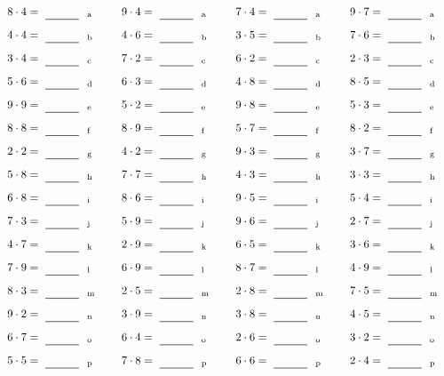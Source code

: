 \documentclass
[
  draft    = true,
  fontsize = 11pt,
  parskip  = half-
]
{scrartcl}
\begin{document}
\par\vfill\par
\begin{align*}
    \pline{8\cdot4}&=\rline{a}
  & \pline{9\cdot4}&=\rline{a}
  & \pline{7\cdot4}&=\rline{a}
  & \pline{9\cdot7}&=\rline{a} \\[1ex]
    \pline{4\cdot4}&=\rline{b}
  & \pline{4\cdot6}&=\rline{b}
  & \pline{3\cdot5}&=\rline{b}
  & \pline{7\cdot6}&=\rline{b} \\[1ex]
    \pline{3\cdot4}&=\rline{c}
  & \pline{7\cdot2}&=\rline{c}
  & \pline{6\cdot2}&=\rline{c}
  & \pline{2\cdot3}&=\rline{c} \\[1ex]
    \pline{5\cdot6}&=\rline{d}
  & \pline{6\cdot3}&=\rline{d}
  & \pline{4\cdot8}&=\rline{d}
  & \pline{8\cdot5}&=\rline{d} \\[1ex]
    \pline{9\cdot9}&=\rline{e}
  & \pline{5\cdot2}&=\rline{e}
  & \pline{9\cdot8}&=\rline{e}
  & \pline{5\cdot3}&=\rline{e} \\[1ex]
    \pline{8\cdot8}&=\rline{f}
  & \pline{8\cdot9}&=\rline{f}
  & \pline{5\cdot7}&=\rline{f}
  & \pline{8\cdot2}&=\rline{f} \\[1ex]
    \pline{2\cdot2}&=\rline{g}
  & \pline{4\cdot2}&=\rline{g}
  & \pline{9\cdot3}&=\rline{g}
  & \pline{3\cdot7}&=\rline{g} \\[1ex]
    \pline{5\cdot8}&=\rline{h}
  & \pline{7\cdot7}&=\rline{h}
  & \pline{4\cdot3}&=\rline{h}
  & \pline{3\cdot3}&=\rline{h} \\[1ex]
    \pline{6\cdot8}&=\rline{i}
  & \pline{8\cdot6}&=\rline{i}
  & \pline{9\cdot5}&=\rline{i}
  & \pline{5\cdot4}&=\rline{i} \\[1ex]
    \pline{7\cdot3}&=\rline{j}
  & \pline{5\cdot9}&=\rline{j}
  & \pline{9\cdot6}&=\rline{j}
  & \pline{2\cdot7}&=\rline{j} \\[1ex]
    \pline{4\cdot7}&=\rline{k}
  & \pline{2\cdot9}&=\rline{k}
  & \pline{6\cdot5}&=\rline{k}
  & \pline{3\cdot6}&=\rline{k} \\[1ex]
    \pline{7\cdot9}&=\rline{l}
  & \pline{6\cdot9}&=\rline{l}
  & \pline{8\cdot7}&=\rline{l}
  & \pline{4\cdot9}&=\rline{l} \\[1ex]
    \pline{8\cdot3}&=\rline{m}
  & \pline{2\cdot5}&=\rline{m}
  & \pline{2\cdot8}&=\rline{m}
  & \pline{7\cdot5}&=\rline{m} \\[1ex]
    \pline{9\cdot2}&=\rline{n}
  & \pline{3\cdot9}&=\rline{n}
  & \pline{3\cdot8}&=\rline{n}
  & \pline{4\cdot5}&=\rline{n} \\[1ex]
    \pline{6\cdot7}&=\rline{o}
  & \pline{6\cdot4}&=\rline{o}
  & \pline{2\cdot6}&=\rline{o}
  & \pline{3\cdot2}&=\rline{o} \\[1ex]
    \pline{5\cdot5}&=\rline{p}
  & \pline{7\cdot8}&=\rline{p}
  & \pline{6\cdot6}&=\rline{p}
  & \pline{2\cdot4}&=\rline{p}
\end{align*}
\end{document}
